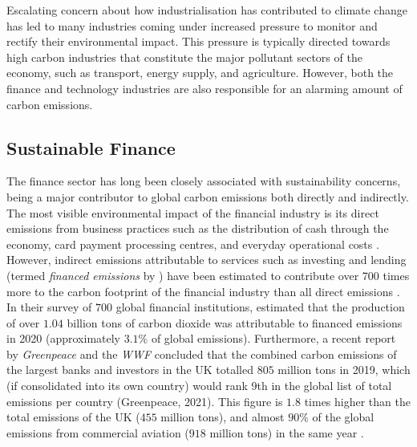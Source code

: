 \documentclass[a4paper, 11pt]{report}
\begin{document}
    Escalating concern about how industrialisation has contributed to climate change has led to many industries coming under increased pressure to monitor and rectify their environmental impact. This pressure is typically directed towards high carbon industries that constitute the major pollutant sectors of the economy, such as transport, energy supply, and agriculture. However, both the finance and technology industries are also responsible for an alarming amount of carbon emissions.


    \subsection{Sustainable Finance}

    The finance sector has long been closely associated with sustainability concerns, being a major contributor to global carbon emissions both directly and indirectly. The most visible environmental impact of the financial industry is its direct emissions from business practices such as the distribution of cash through the economy, card payment processing centres, and everyday operational costs \citep{hanegraaf-2018}. However, indirect emissions attributable to services such as investing and lending (termed \emph{financed emissions} by \citet{power-2020}) have been estimated to contribute over 700 times more to the carbon footprint of the financial industry than all direct emissions \citep{power-2020}. In their survey of $700$ global financial institutions, \citet{power-2020} estimated that the production of over $1.04$ billion tons of carbon dioxide was attributable to financed emissions in 2020 (approximately $3.1\%$ of global emissions). Furthermore, a recent report by \emph{Greenpeace} and the \emph{WWF} concluded that the combined carbon emissions of the largest banks and investors in the UK totalled $805$ million tons in 2019, which (if consolidated into its own country) would rank 9th in the global list of total emissions per country (Greenpeace, 2021). This figure is $1.8$ times higher than the total emissions of the UK ($455$ million tons), and almost $90\%$ of the global emissions from commercial aviation ($918$ million tons) in the same year \citep{graver-2020}.
\end{document}
